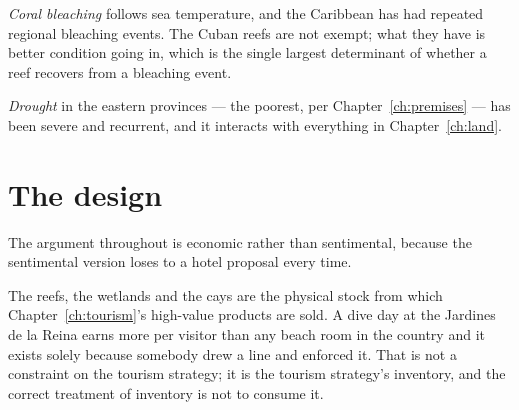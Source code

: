\emph{Coral bleaching} follows sea temperature, and the Caribbean has had
repeated regional bleaching events. The Cuban reefs are not exempt; what they
have is better condition going in, which is the single largest determinant of
whether a reef recovers from a bleaching event.

\emph{Drought} in the eastern provinces --- the poorest, per
Chapter~\ref{ch:premises} --- has been severe and recurrent, and it interacts
with everything in Chapter~\ref{ch:land}.

\section{The design}

The argument throughout is economic rather than sentimental, because the
sentimental version loses to a hotel proposal every time.

The reefs, the wetlands and the cays are the physical stock from which
Chapter~\ref{ch:tourism}'s high-value products are sold. A dive day at the
Jardines de la Reina earns more per visitor than any beach room in the country
and it exists solely because somebody drew a line and enforced it. That is not a
constraint on the tourism strategy; it is the tourism strategy's inventory, and
the correct treatment of inventory is not to consume it.

